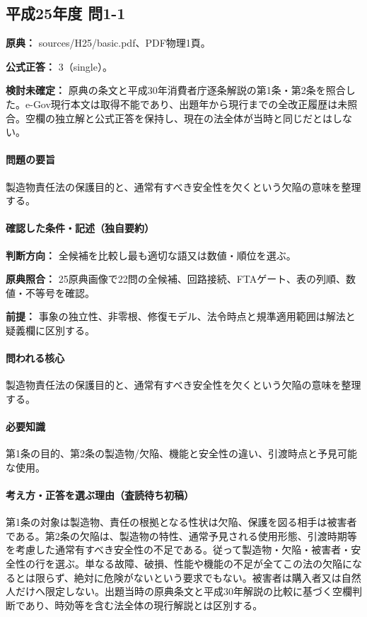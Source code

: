 \subsection{平成25年度 問1-1}
\label{q:h25-reg-basic-1-1}

\noindent\textbf{原典：} sources/H25/basic.pdf、PDF物理1頁。

\textbf{公式正答：} 3（single）。

\par\textbf{検討未確定：} 原典の条文と平成30年消費者庁逐条解説の第1条・第2条を照合した。e-Gov現行本文は取得不能であり、出題年から現行までの全改正履歴は未照合。空欄の独立解と公式正答を保持し、現在の法全体が当時と同じだとはしない。

\paragraph{問題の要旨} 製造物責任法の保護目的と、通常有すべき安全性を欠くという欠陥の意味を整理する。

\paragraph{確認した条件・記述（独自要約）}\mbox{}\par

\noindent\textbf{判断方向：} 全候補を比較し最も適切な語又は数値・順位を選ぶ。\par

\noindent\textbf{原典照合：} 25原典画像で22問の全候補、回路接続、FTAゲート、表の列順、数値・不等号を確認。\par

\noindent\textbf{前提：} 事象の独立性、非零根、修復モデル、法令時点と規準適用範囲は解法と疑義欄に区別する。\par

\paragraph{問われる核心} 製造物責任法の保護目的と、通常有すべき安全性を欠くという欠陥の意味を整理する。

\paragraph{必要知識} 第1条の目的、第2条の製造物/欠陥、機能と安全性の違い、引渡時点と予見可能な使用。

\paragraph{考え方・正答を選ぶ理由（査読待ち初稿）} 第1条の対象は製造物、責任の根拠となる性状は欠陥、保護を図る相手は被害者である。第2条の欠陥は、製造物の特性、通常予見される使用形態、引渡時期等を考慮した通常有すべき安全性の不足である。従って製造物・欠陥・被害者・安全性の行を選ぶ。単なる故障、破損、性能や機能の不足が全てこの法の欠陥になるとは限らず、絶対に危険がないという要求でもない。被害者は購入者又は自然人だけへ限定しない。出題当時の原典条文と平成30年解説の比較に基づく空欄判断であり、時効等を含む法全体の現行解説とは区別する。

